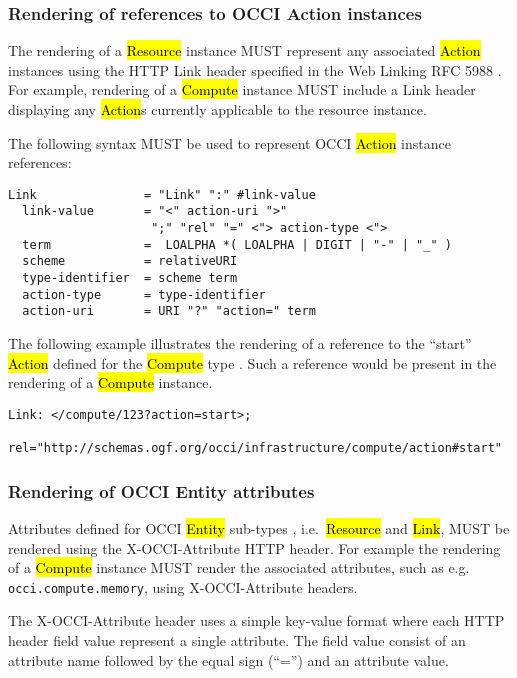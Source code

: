 \documentclass[10pt,a4paper]{article}
\begin{document}
\subsubsection{Rendering of references to OCCI Action instances}
The rendering of a \hl{Resource} instance \cite{occi:core} MUST
represent any associated \hl{Action} instances using the HTTP Link
header specified in the Web Linking RFC 5988 \cite{rfc5988}.  For
example, rendering of a \hl{Compute} instance MUST include a Link
header displaying any \hl{Action}s currently applicable to the
resource instance.

The following syntax MUST be used to represent OCCI \hl{Action}
instance references:

\begin{verbatim}
Link               = "Link" ":" #link-value
  link-value       = "<" action-uri ">"
                    ";" "rel" "=" <"> action-type <">
  term             =  LOALPHA *( LOALPHA | DIGIT | "-" | "_" )
  scheme           = relativeURI
  type-identifier  = scheme term
  action-type      = type-identifier
  action-uri       = URI "?" "action=" term
\end{verbatim}

The following example illustrates the rendering of a reference to the
``start'' \hl{Action} defined for the \hl{Compute} type
\cite{occi:infrastructure}. Such a reference would be present in the
rendering of a \hl{Compute} instance.

\begin{verbatim}
Link: </compute/123?action=start>;
    rel="http://schemas.ogf.org/occi/infrastructure/compute/action#start"
\end{verbatim}

\subsubsection{Rendering of OCCI Entity attributes}
Attributes defined for OCCI \hl{Entity} sub-types \cite{occi:core},
i.e.~\hl{Resource} and \hl{Link}, MUST be rendered using the
X-OCCI-Attribute HTTP header. For example the rendering of a
\hl{Compute} instance MUST render the associated attributes, such as
e.g. \texttt{occi.compute.memory}, using X-OCCI-Attribute headers.

The X-OCCI-Attribute header uses a simple key-value format where each
HTTP header field value represent a single attribute. The field value
consist of an attribute name followed by the equal sign (``='') and an
attribute value.
\end{document}
